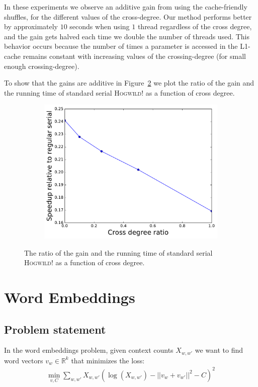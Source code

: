 \documentclass[times,11pt]{article}
\numberwithin{equation}{section}		%
\numberwithin{figure}{section}			%
\numberwithin{table}{section}				%
\newcommand{\ltwonorm}[1]{\left|\left|{#1}\right|\right|}
\newcommand{\HW}{\textsc{Hogwild!}}
\begin{document}
In these experiments we observe an additive gain from using the cache-friendly shuffles, for the different values of the cross-degree. Our method performs better by approximately $10$ seconds when using $1$ thread regardless of the cross degree, and the gain gets halved each time we double the number of threads used. This behavior occurs because the number of times a parameter is accessed in the L1-cache remains constant with increasing values of the crossing-degree (for small enough crossing-degree). 


To show that the gains are additive in Figure~\ref{fig:crossratio} we plot the ratio of the gain and the running time of standard serial \HW{} as a function of cross degree.
\begin{figure}[h!]
\centering
    \begin{subfigure}[b]{0.49\columnwidth}
	\centerline{\includegraphics[width = 0.85\columnwidth, trim={0 0.1cm  0 0}, clip]{report_serial_cache_gains.pdf}}
      \caption{\scriptsize }
      \label{fig:crossratio}
    \end{subfigure}
  \caption{The ratio of the gain and the running time of standard serial \HW{} as a function of cross degree.}
\end{figure}

\section{Word Embeddings}\label{sec:w2v}

\subsection{Problem statement}
In the word embeddings problem, given context counts $X_{w,w'}$ we want to find word vectors
$v_{w} \in \mathbb{R}^{k}$ that minimizes the loss:
\begin{align*}
\min_{v,C}\sum_{w,w'}X_{w,w'} \left(\log(X_{w,w'}) - \ltwonorm{v_w+v_{w'}}^2 - C\right)^2
\end{align*}
\end{document}
